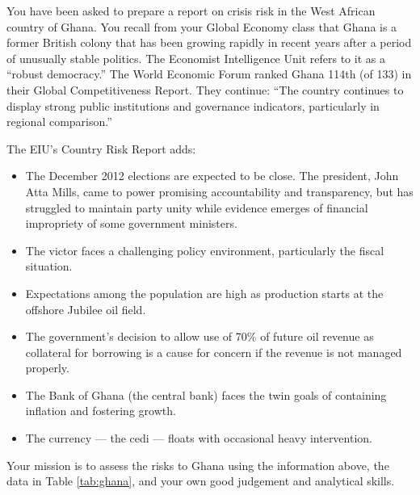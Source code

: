 \documentclass[letterpaper,12pt]{exam}
\begin{document}
\begin{questions}
You have been asked to prepare a report on crisis risk in
the West African country of Ghana.
You recall from your Global Economy class that
Ghana is a former British colony that has been growing rapidly
in recent years after a period of unusually stable politics.
The Economist Intelligence Unit refers to it as a ``robust democracy.''
The World Economic Forum ranked Ghana 114th (of 133)
in their Global Competitiveness Report.
They continue:
``The country continues to display strong public institutions and
governance indicators,
particularly in regional comparison.''

The EIU's Country Risk Report adds:
\begin{itemize}
\item The December 2012 elections are expected to be close.
The president, John Atta Mills, came to power promising accountability
and transparency, but  has struggled to maintain party unity
while evidence emerges of financial impropriety of some government ministers.
\item The victor faces a challenging policy environment, particularly
the fiscal situation.
\item Expectations among the population are high as production
starts at the offshore Jubilee oil field.
\item The government's decision to allow use of 70\% of future
oil revenue as collateral for borrowing is a cause for concern
if the revenue is not managed properly.
\item The Bank of Ghana (the central bank) faces the twin goals of
containing inflation and fostering growth.
\item The currency --- the cedi --- floats with occasional heavy intervention.
\end{itemize}
%
Your mission is to assess the risks to Ghana  using
the information above, the data in Table \ref{tab:ghana},
and your own good judgement and analytical skills.

\end{questions}
\end{document}
